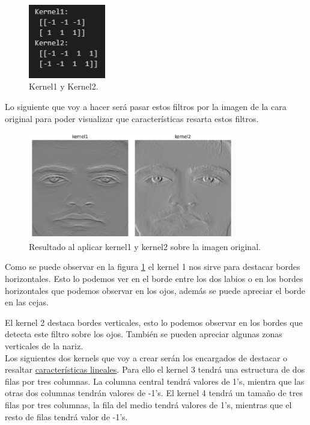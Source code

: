 \documentclass[a4paper]{article}
\begin{document}
\begin{figure}[H]
    \centering
    \includegraphics[width=0.3\textwidth]{../img/k1k2.png}
    \caption{Kernel1 y Kernel2.}
\end{figure}

Lo siguiente que voy a hacer será pasar estos filtros por la imagen de la cara original para poder visualizar que características resarta estos filtros.

\begin{figure}[H]
    \centering
    \includegraphics[width=0.80\textwidth]{../img/resultadok1k2.png}
    \caption{Resultado al aplicar kernel1 y kernel2 sobre la imagen original.}
    \label{f:f}
\end{figure}

Como se puede observar en la figura \ref{f:f} el kernel 1 nos sirve para destacar bordes horizontales.
Esto lo podemos ver en el borde entre los dos labios o en los bordes horizontales que podemos observar en los ojos, además se puede apreciar el borde en las cejas.

El kernel 2 destaca bordes verticales, esto lo podemos observar en los bordes que detecta este filtro sobre los ojos.
También se pueden apreciar algunas zonas verticales de la nariz.\\

Los siguientes dos kernels que voy a crear serán los encargados de destacar o resaltar \underline{características lineales}.
Para ello el kernel 3 tendrá una estructura de dos filas por tres columnas.
La columna central tendrá valores de 1's, mientra que las otras dos columnas tendrán valores de -1's.
El kernel 4 tendrá un tamaño de tres filas por tres columnas, la fila del medio tendrá valores de 1's, mientras que el resto de filas tendrá valor de -1's.
\end{document}
